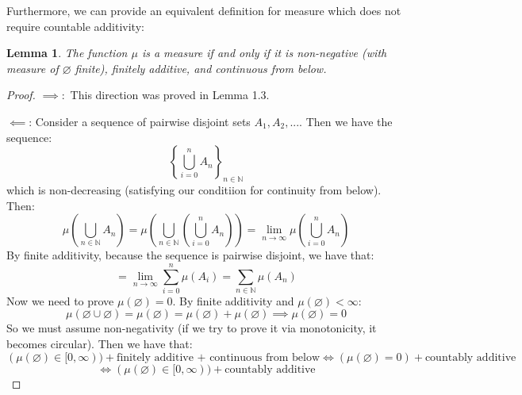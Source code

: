 \documentclass[10pt,letterpaper]{article} %
\newtheorem{lem}{Lemma}[section]
\begin{document}
Furthermore, we can provide an equivalent definition for measure which does not require countable additivity:
\begin{lem}
The function $\mu$ is a measure if and only if it is non-negative (with measure of $\varnothing$ finite), finitely additive, and continuous from below.
\end{lem}
\begin{proof}
$\implies:$ This direction was proved in Lemma 1.3.


$\impliedby$: Consider a sequence of pairwise disjoint sets $A_1, A_2, ...$. Then we have the sequence:
\begin{equation*}
\left\{\bigcup_{i=0}^n A_n\right\}_{n \in \mathbb{N}}
\end{equation*}
which is non-decreasing (satisfying our conditiion for continuity from below). Then:
\begin{equation*}
\mu\left(\bigcup_{n \in \mathbb{N}}A_n\right) = \mu\left(\bigcup_{n \in \mathbb{N}}\left(\bigcup_{i=0}^n A_n\right)\right) = \lim_{n \xrightarrow{} \infty}\mu\left(\bigcup_{i=0}^n A_n\right)
\end{equation*}
By finite additivity, because the sequence is pairwise disjoint, we have that:
\begin{equation*}
= \lim_{n \xrightarrow{} \infty}\sum_{i=0}^{n}\mu(A_i) = \sum_{n \in \mathbb{N}}\mu(A_n)
\end{equation*}
Now we need to prove $\mu(\varnothing) = 0$. By finite additivity and $\mu(\varnothing) < \infty$:
\begin{equation*}
\mu(\varnothing \cup \varnothing) = \mu(\varnothing) = \mu(\varnothing) + \mu(\varnothing) \implies \mu(\varnothing) = 0
\end{equation*}
So we must assume non-negativity (if we try to prove it via monotonicity, it becomes circular). Then we have that:
\begin{equation*}
(\mu(\varnothing) \in [0, \infty)) + \text{finitely additive + continuous from below} \iff (\mu(\varnothing) = 0)  + \text{countably additive}
\end{equation*}
\begin{equation*}
\iff (\mu(\varnothing) \in [0, \infty)) + \text{countably additive}
\end{equation*}

\end{proof}
\end{document}
